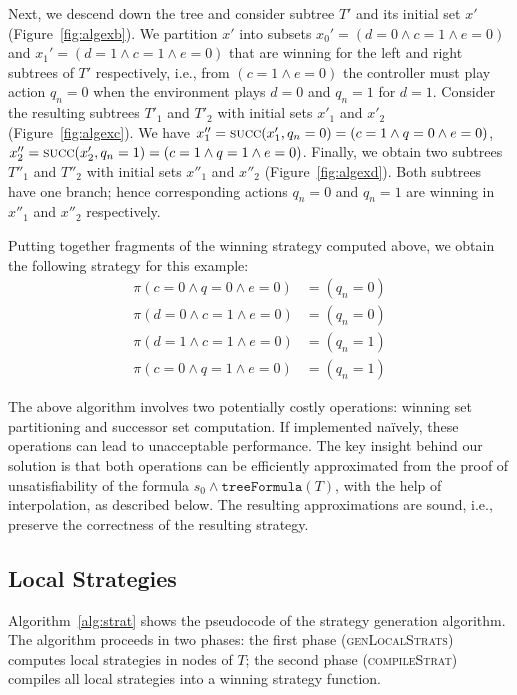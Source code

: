Next, we descend down the tree and consider subtree $T'$ and its initial set $x'$ (Figure~\ref{fig:algexb}).  We partition $x'$ into subsets $x_0' = (d = 0 \land c = 1 \land e = 0)$ and $x_1' = (d = 1 \land c = 1 \land e = 0)$ that are winning for the left and right subtrees of $T'$ respectively, i.e., from $(c = 1 \land e = 0)$ the controller must play action $q_n = 0$ when the environment plays $d = 0$ and $q_n = 1$ for $d = 1$.  Consider the resulting subtrees $T'_1$ and $T'_2$ with initial sets $x'_1$ and $x'_2$ (Figure~\ref{fig:algexc}).  We have $x''_1 = \textsc{succ}(x'_1, q_n = 0) = (c = 1 \land q = 0 \land e = 0)$, $x''_2 = \textsc{succ}(x'_2, q_n = 1) = (c = 1 \land q = 1 \land e = 0)$.  Finally, we obtain two subtrees $T''_1$ and $T''_2$ with initial sets $x''_1$ and $x''_2$ (Figure~\ref{fig:algexd}).  Both subtrees have one branch; hence corresponding actions $q_n = 0$ and $q_n = 1$ are winning in $x''_1$ and $x''_2$ respectively.

Putting together fragments of the winning strategy computed above, we obtain the following strategy for this example:
\begin{align*}
    \pi(c = 0 \land q = 0 \land e = 0) &= (q_n = 0) \\
    \pi(d = 0 \land c = 1 \land e = 0) &= (q_n = 0) \\
    \pi(d = 1 \land c = 1 \land e = 0) &= (q_n = 1) \\
    \pi(c = 0 \land q = 1 \land e = 0) &= (q_n = 1)
\end{align*}

The above algorithm involves two potentially costly operations: winning set partitioning and successor set computation.  If implemented na\"ively, these operations can lead to unacceptable performance.  The key insight behind our solution is that both operations can be efficiently approximated from the proof of unsatisfiability of the formula $s_0 \land \texttt{treeFormula}(T)$, with the help of interpolation, as described below.  The resulting approximations are sound, i.e., preserve the correctness of the resulting strategy.

\subsection{Local Strategies}

Algorithm~\ref{alg:strat} shows the pseudocode of the strategy generation algorithm.  The algorithm proceeds in two phases: the first phase (\textsc{genLocalStrats}) computes local strategies in nodes of $T$; the second phase (\textsc{compileStrat}) compiles all local strategies into a winning strategy function.

